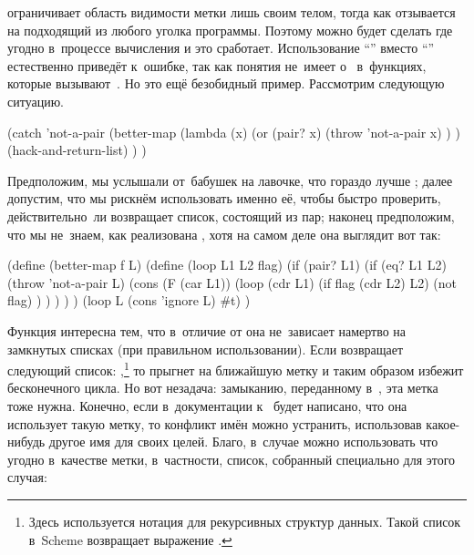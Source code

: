  ограничивает область видимости метки лишь своим телом, тогда как
 отзывается на подходящий  из любого уголка программы.
Поэтому можно будет сделать  где угодно в~процессе
вычисления  и это сработает. Использование "`"'
вместо "`"' естественно приведёт к~ошибке, так как
 понятия не~имеет о~ в~функциях, которые
вызывают~. Но это ещё безобидный пример. Рассмотрим следующую ситуацию.

\begin{code:lisp}[label=escape/forms/catch-vs-block/p:better-map]
(catch 'not-a-pair
  (better-map (lambda (x)
                (or (pair? x)
                    (throw 'not-a-pair x) ) )
              (hack-and-return-list) ) )
\end{code:lisp}

Предположим, мы услышали от~бабушек на лавочке, что  гораздо
лучше ; далее допустим, что мы рискнём использовать именно её, чтобы
быстро проверить, действительно~ли  возвращает
список, состоящий из пар; наконец предположим, что мы не~знаем, как реализована
, хотя на самом деле она выглядит вот так:

\begin{code:lisp}
(define (better-map f L)
  (define (loop L1 L2 flag)
    (if (pair? L1)
        (if (eq? L1 L2)
            (throw 'not-a-pair L)
            (cons (F (car L1))
                  (loop (cdr L1)
                        (if flag (cdr L2) L2)
                        (not flag) ) ) ) ) )
  (loop L (cons 'ignore L) #t) )
\end{code:lisp}

Функция  интересна тем, что в~отличие от  она не~зависает
намертво на замкнутых списках (при правильном использовании). Если
 возвращает следующий список: ,\footnote*{Здесь используется нотация {\CommonLisp} для рекурсивных
структур данных. Такой список в~Scheme возвращает выражение .} то  прыгнет на
ближайшую метку  и таким образом избежит бесконечного цикла. Но
вот незадача: замыканию, переданному в~, эта метка тоже нужна.
Конечно, если в~документации к~ будет написано, что она
использует такую метку, то конфликт имён можно устранить, использовав
какое-нибудь другое имя для своих целей. Благо, в~случае  можно
использовать что угодно в~качестве метки, в~частности, список, собранный
специально для этого случая:

